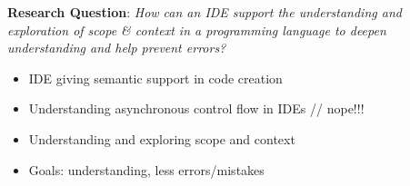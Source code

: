 \textbf{Research Question}: \emph{How can an IDE support the
understanding and exploration of scope \& context in a programming
language to deepen understanding and help prevent errors?}

\begin{itemize}
\itemsep1pt\parskip0pt
\item
  IDE giving semantic support in code creation
\item
  Understanding asynchronous control flow in IDEs // nope!!!
\item
  Understanding and exploring scope and context
\item
  Goals: understanding, less errors/mistakes
\end{itemize}
